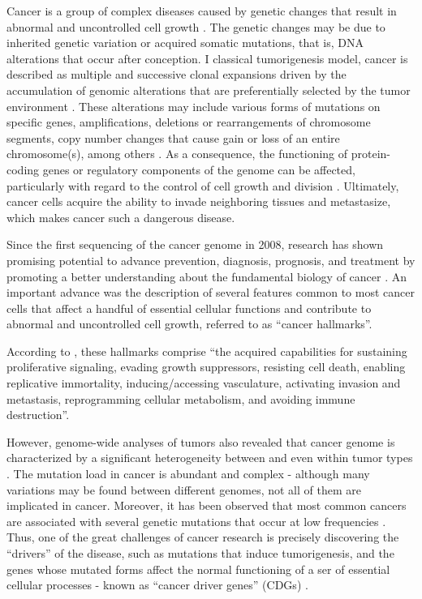 Cancer is a group of complex diseases caused by genetic changes that result in abnormal and uncontrolled cell growth \cite{stratton2009cancer}. The genetic changes may be due to inherited genetic variation or acquired somatic mutations, that is, DNA alterations that occur after conception. I classical tumorigenesis model, cancer is described as multiple and successive clonal expansions driven by the accumulation of genomic alterations that are preferentially selected by the tumor environment \cite{yates2012evolution}. These alterations may include various forms of mutations on specific genes, amplifications, deletions or rearrangements of chromosome segments, copy number changes that cause gain or loss of an entire chromosome(s), among others \cite{shenzhiyuan2011}. As a consequence, the functioning of protein-coding genes or regulatory components of the genome can be affected, particularly with regard to the control of cell growth and division \cite{stratton2009cancer}. Ultimately, cancer cells acquire the ability to invade neighboring tissues and metastasize, which makes cancer such a dangerous disease.


Since the first sequencing of the cancer genome in 2008, research has shown promising potential to advance prevention, diagnosis, prognosis, and treatment by promoting a better understanding about the fundamental biology of cancer \cite{mwenifumbo2013cancer}. An important advance was the description of several features common to most cancer cells that affect a handful of essential cellular functions and contribute to abnormal and uncontrolled cell growth, referred to as ``cancer hallmarks''. 

According to \citet{hanahan2022hallmarks}, these hallmarks comprise ``the acquired capabilities for sustaining proliferative signaling, evading growth suppressors, resisting cell death, enabling replicative immortality, inducing/accessing vasculature, activating invasion and metastasis, reprogramming cellular metabolism, and avoiding immune destruction''.

However, genome-wide analyses of tumors also revealed that cancer genome is characterized by a significant heterogeneity between and even within tumor types \cite{vogelstein2013cancer}.
The mutation load in cancer is abundant and complex - although many variations may be found between different genomes, not all of them are implicated in cancer. Moreover, it has been observed that most common cancers are associated with several genetic mutations that occur at low frequencies \cite{yates2012evolution}. Thus, one of the great challenges of cancer research is precisely discovering the ``drivers'' of the disease, such as mutations that induce tumorigenesis, and the genes whose mutated forms affect the normal functioning of a ser of essential cellular processes - known as ``cancer driver genes'' (CDGs) \cite{martinez2020compendium}. 

